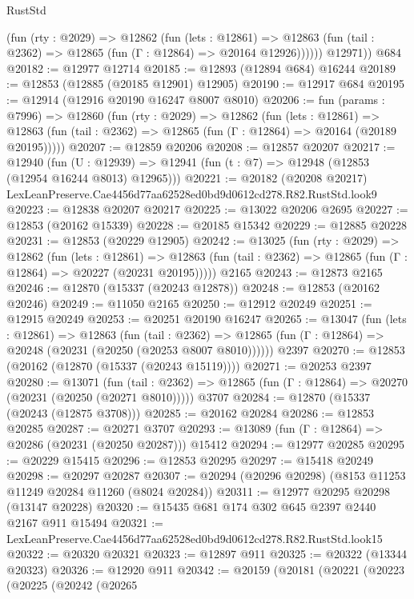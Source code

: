 \begin{lexlean}{RustStd}
\begin{coremodule}
            (fun (rty : @2029) =>
            @12862
              (fun (lets : @12861) =>
              @12863 (fun (tail : @2362) => @12865 (fun (Γ : @12864) => @20164 @12926))))))
        @12971))
    @684
@20182 := @12977 @12714
@20185 := @12893 (@12894 @684) @16244
@20189 := @12853 (@12885 (@20185 @12901) @12905)
@20190 := @12917 @684
@20195 := @12914 (@12916 @20190 @16247 @8007 @8010)
@20206 := fun (params : @7996) =>
  @12860
    (fun (rty : @2029) =>
    @12862
      (fun (lets : @12861) =>
      @12863 (fun (tail : @2362) => @12865 (fun (Γ : @12864) => @20164 (@20189 @20195)))))
@20207 := @12859 @20206
@20208 := @12857 @20207
@20217 := @12940
    (fun (U : @12939) => @12941 (fun (t : @7) => @12948 (@12853 (@12954 @16244 @8013) @12965)))
@20221 := @20182 (@20208 @20217) LexLeanPreserve.Cae4456d77aa62528ed0bd9d0612cd278.R82.RustStd.look9
@20223 := @12838 @20207 @20217
@20225 := @13022 @20206 @2695
@20227 := @12853 (@20162 @15339)
@20228 := @20185 @15342
@20229 := @12885 @20228
@20231 := @12853 (@20229 @12905)
@20242 := @13025
    (fun (rty : @2029) =>
    @12862
      (fun (lets : @12861) =>
      @12863 (fun (tail : @2362) => @12865 (fun (Γ : @12864) => @20227 (@20231 @20195)))))
    @2165
@20243 := @12873 @2165
@20246 := @12870 (@15337 (@20243 @12878))
@20248 := @12853 (@20162 @20246)
@20249 := @11050 @2165
@20250 := @12912 @20249
@20251 := @12915 @20249
@20253 := @20251 @20190 @16247
@20265 := @13047
    (fun (lets : @12861) =>
    @12863
      (fun (tail : @2362) =>
      @12865 (fun (Γ : @12864) => @20248 (@20231 (@20250 (@20253 @8007 @8010))))))
    @2397
@20270 := @12853 (@20162 (@12870 (@15337 (@20243 @15119))))
@20271 := @20253 @2397
@20280 := @13071
    (fun (tail : @2362) => @12865 (fun (Γ : @12864) => @20270 (@20231 (@20250 (@20271 @8010)))))
    @3707
@20284 := @12870 (@15337 (@20243 (@12875 @3708)))
@20285 := @20162 @20284
@20286 := @12853 @20285
@20287 := @20271 @3707
@20293 := @13089 (fun (Γ : @12864) => @20286 (@20231 (@20250 @20287))) @15412
@20294 := @12977 @20285
@20295 := @20229 @15415
@20296 := @12853 @20295
@20297 := @15418 @20249
@20298 := @20297 @20287
@20307 := @20294 (@20296 @20298) (@8153 @11253 @11249 @20284 @11260 (@8024 @20284))
@20311 := @12977 @20295 @20298 (@13147 @20228)
@20320 := @15435 @681 @174 @302 @645 @2397 @2440 @2167 @911 @15494
@20321 := LexLeanPreserve.Cae4456d77aa62528ed0bd9d0612cd278.R82.RustStd.look15
@20322 := @20320 @20321
@20323 := @12897 @911
@20325 := @20322 (@13344 @20323)
@20326 := @12920 @911
@20342 := @20159
    (@20181
      (@20221
        (@20223
          (@20225
            (@20242
              (@20265

\end{coremodule}
\end{lexlean}
